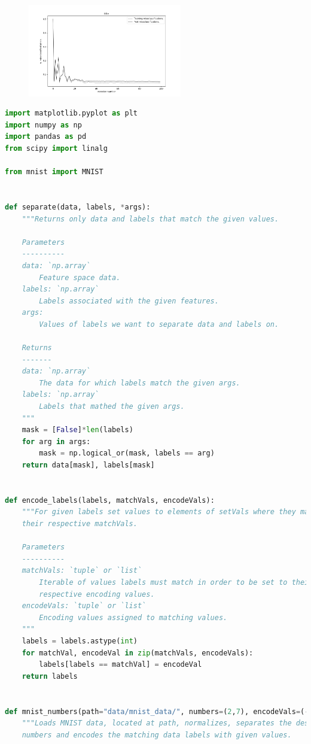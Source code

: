 \documentclass{article}
\newcommand{\1}{\mathbf{1}}
\begin{document}
\begin{enumerate}
    \begin{figure}[h!]
    \centering
        \includegraphics[width=0.6\textwidth]{HW2/HW2_plots/missclassificationsA6d.png}
    \end{figure}
\end{enumerate}

\newpage
\begin{lstlisting}[language=Python]
import matplotlib.pyplot as plt
import numpy as np
import pandas as pd
from scipy import linalg

from mnist import MNIST


def separate(data, labels, *args):
    """Returns only data and labels that match the given values.

    Parameters
    ----------
    data: `np.array`
        Feature space data.
    labels: `np.array`
        Labels associated with the given features.
    args:
        Values of labels we want to separate data and labels on.

    Returns
    -------
    data: `np.array`
        The data for which labels match the given args.
    labels: `np.array`
        Labels that mathed the given args.
    """
    mask = [False]*len(labels)
    for arg in args:
        mask = np.logical_or(mask, labels == arg)
    return data[mask], labels[mask]


def encode_labels(labels, matchVals, encodeVals):
    """For given labels set values to elements of setVals where they match
    their respective matchVals.

    Parameters
    ----------
    matchVals: `tuple` or `list`
        Iterable of values labels must match in order to be set to their
        respective encoding values.
    encodeVals: `tuple` or `list`
        Encoding values assigned to matching values.
    """
    labels = labels.astype(int)
    for matchVal, encodeVal in zip(matchVals, encodeVals):
        labels[labels == matchVal] = encodeVal
    return labels


def mnist_numbers(path="data/mnist_data/", numbers=(2,7), encodeVals=(-1, 1)):
    """Loads MNIST data, located at path, normalizes, separates the desired
    numbers and encodes the matching data labels with given values.


\end{lstlisting}
\end{document}
